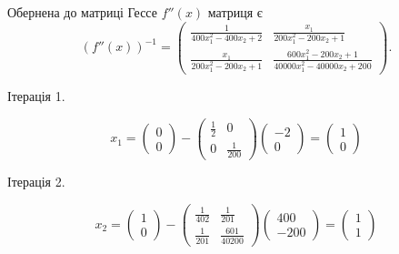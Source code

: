 \documentclass[14pt,a4paper]{extarticle}
\theoremstyle{definition}
\renewcommand{\[}{\begin{dmath*}[compact]}
\renewcommand{\]}{\end{dmath*}}
\begin{document}
Обернена до матриці Гессе $f''(x)$ матриця є
\[(f''(x))^{-1}=\left(\begin{matrix}\frac{1}{400 x_{1}^{2} - 400 x_{2} + 2} & \frac{x_{1}}{200 x_{1}^{2} - 200 x_{2} + 1}\\\frac{x_{1}}{200 x_{1}^{2} - 200 x_{2} + 1} & \frac{600 x_{1}^{2} - 200 x_{2} + 1}{40000 x_{1}^{2} - 40000 x_{2} + 200}\end{matrix}\right).\]

Ітерація 1.

\[x_{1} = \left(\begin{matrix}0\\0\end{matrix}\right) - \left(\begin{matrix}\frac{1}{2} & 0\\0 & \frac{1}{200}\end{matrix}\right) \left(\begin{matrix}-2\\0\end{matrix}\right) = \left(\begin{matrix}1\\0\end{matrix}\right)\]

Ітерація 2.

\[x_{2} = \left(\begin{matrix}1\\0\end{matrix}\right) - \left(\begin{matrix}\frac{1}{402} & \frac{1}{201}\\\frac{1}{201} & \frac{601}{40200}\end{matrix}\right) \left(\begin{matrix}400\\-200\end{matrix}\right) = \left(\begin{matrix}1\\1\end{matrix}\right)\]
\end{document}

